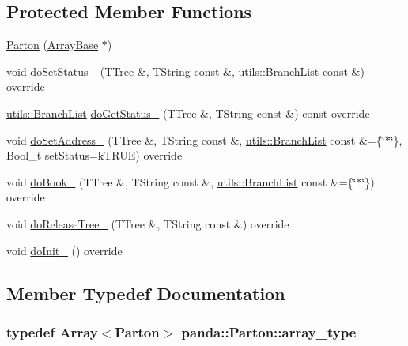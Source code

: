 \subsection*{Protected Member Functions}
\begin{DoxyCompactItemize}
\item 
\hyperlink{classpanda_1_1Parton_a62acba569cc4187e35b3401e912a3bb5}{Parton} (\hyperlink{classpanda_1_1ArrayBase}{ArrayBase} $\ast$)
\item 
void \hyperlink{classpanda_1_1Parton_a4471a7ad47570d85d6cd5ffa3c67b4d2}{doSetStatus\_\-} (TTree \&, TString const \&, \hyperlink{classpanda_1_1utils_1_1BranchList}{utils::BranchList} const \&) override
\item 
\hyperlink{classpanda_1_1utils_1_1BranchList}{utils::BranchList} \hyperlink{classpanda_1_1Parton_ab3709c6ae8b88560326291d4d1598c6b}{doGetStatus\_\-} (TTree \&, TString const \&) const override
\item 
void \hyperlink{classpanda_1_1Parton_a2ab83f4fa3a99a93c7bf17ab2233a25a}{doSetAddress\_\-} (TTree \&, TString const \&, \hyperlink{classpanda_1_1utils_1_1BranchList}{utils::BranchList} const \&=\{\char`\"{}$\ast$\char`\"{}\}, Bool\_\-t setStatus=kTRUE) override
\item 
void \hyperlink{classpanda_1_1Parton_a6a1af1903a231bc8db97242dda42979a}{doBook\_\-} (TTree \&, TString const \&, \hyperlink{classpanda_1_1utils_1_1BranchList}{utils::BranchList} const \&=\{\char`\"{}$\ast$\char`\"{}\}) override
\item 
void \hyperlink{classpanda_1_1Parton_af0f659274734074ab87ee05f4b1ee6d8}{doReleaseTree\_\-} (TTree \&, TString const \&) override
\item 
void \hyperlink{classpanda_1_1Parton_a4f94d91e76ce70fca972bcdbafec00c2}{doInit\_\-} () override
\end{DoxyCompactItemize}


\subsection{Member Typedef Documentation}
\hypertarget{classpanda_1_1Parton_a779a461ff7aa46eda35c663576532b02}{
\subsubsection[{array\_\-type}]{\setlength{\rightskip}{0pt plus 5cm}typedef {\bf Array}$<${\bf Parton}$>$ {\bf panda::Parton::array\_\-type}}}
\label{classpanda_1_1Parton_a779a461ff7aa46eda35c663576532b02}


